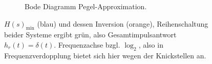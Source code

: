 \begin{figure}[h]
\begin{subfigure}{\textwidth}
\caption{Bode Diagramm Pegel-Approximation.}
\label{fig:bode_tikz_4926427BA9}
\end{subfigure}
\caption{$H(s)_\mathrm{min}$ (blau) und dessen Inversion (orange),
Reihenschaltung beider Systeme ergibt grün, also Gesamtimpulsantwort $h_r(t)=\delta(t)$.
Frequenzachse bzgl. $\log_2$, also in Frequenzverdopplung bietet sich
hier wegen der Knickstellen an.}
\label{fig:inversion_4926427BA9_plus_tikz}
\end{figure}
\clearpage







\newpage
